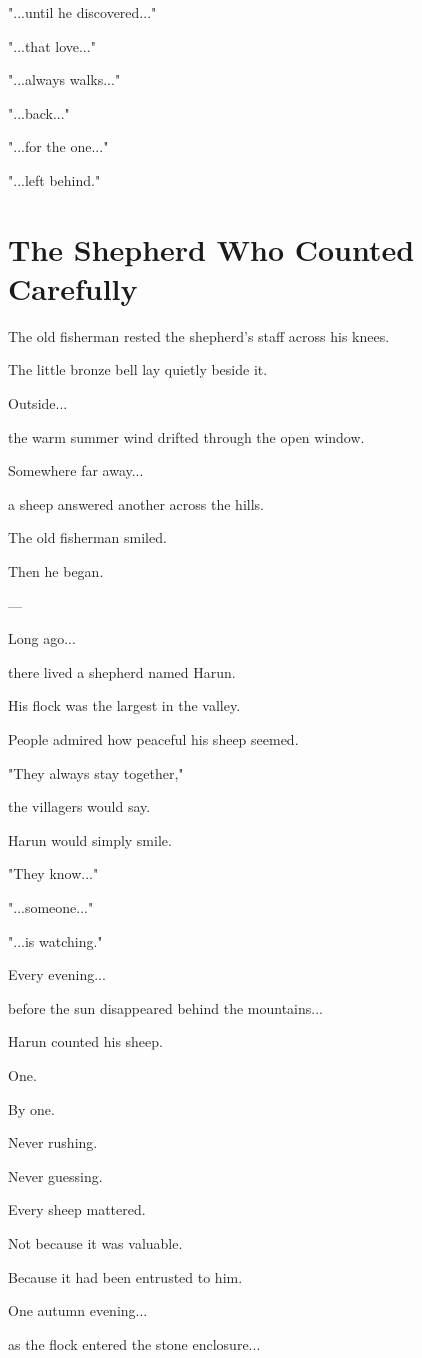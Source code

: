 \documentclass[12pt,openany]{book}
\begin{document}
"...until he discovered..."

"...that love..."

"...always walks..."

"...back..."

"...for the one..."

"...left behind."
\section*{The Shepherd Who Counted Carefully}

The old fisherman rested the shepherd's staff across his knees.

The little bronze bell lay quietly beside it.

Outside...

the warm summer wind drifted through the open window.

Somewhere far away...

a sheep answered another across the hills.

The old fisherman smiled.

Then he began.

---

Long ago...

there lived a shepherd named Harun.

His flock was the largest in the valley.

People admired how peaceful his sheep seemed.

"They always stay together,"

the villagers would say.

Harun would simply smile.

"They know..."

"...someone..."

"...is watching."

Every evening...

before the sun disappeared behind the mountains...

Harun counted his sheep.

One.

By one.

Never rushing.

Never guessing.

Every sheep mattered.

Not because it was valuable.

Because it had been entrusted to him.

One autumn evening...

as the flock entered the stone enclosure...
\end{document}
